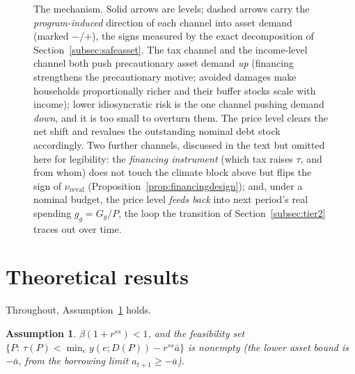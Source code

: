 \documentclass[12pt]{article}
\newtheorem{assumption}{Assumption}
\begin{document}
\begin{figure}[H]
\caption{The mechanism. Solid arrows are levels; dashed arrows carry the
\emph{program-induced} direction of each channel into asset demand
(marked $-$/$+$), the signs measured by the exact decomposition of
Section~\ref{subsec:safeasset}. The tax channel and the income-level
channel both push precautionary asset demand \emph{up} (financing
strengthens the precautionary motive; avoided damages make households
proportionally richer and their buffer stocks scale with income); lower
idiosyncratic risk is the one channel pushing demand \emph{down}, and it
is too small to overturn them. The price level clears the net shift and
revalues the outstanding nominal debt stock accordingly. Two further
channels, discussed in the text but omitted
here for legibility: the \emph{financing instrument} (which tax raises
$\tau$, and from whom) does not touch the climate block above but flips
the sign of $\nu_{\mathrm{reval}}$ (Proposition~\ref{prop:financingdesign});
and, under a nominal budget, the price level \emph{feeds back} into next
period's real spending $g_g=G_g/P$, the loop the transition of
Section~\ref{subsec:tier2} traces out over time.}
\label{fig:mechanism}
\end{figure}

\section{Theoretical results}\label{sec:theory}

Throughout, Assumption~\ref{ass:feasible} holds.

\begin{assumption}\label{ass:feasible}
$\beta(1+r^{ss})<1$, and the feasibility set
$\{P:\ \tau(P) < \min_e y(e;D(P)) - r^{ss}\bar a\}$ is nonempty (the lower
asset bound is $-\bar a$, from the borrowing limit $a_{t+1}\ge-\bar a$).
\end{assumption}

\end{document}
